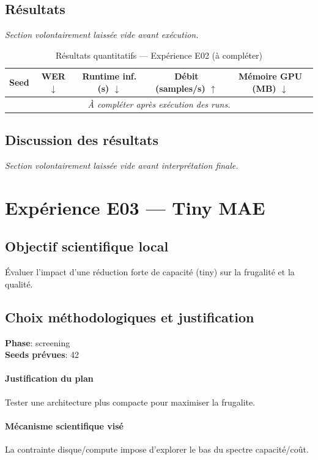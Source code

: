 \documentclass[11pt,a4paper]{article}
\begin{document}
\subsection{Résultats}
\textit{Section volontairement laissée vide avant exécution.}

\begin{table}[H]
\centering
\caption{Résultats quantitatifs --- Expérience E02 (à compléter)}
\begin{tabular}{lcccc}
\toprule
Seed & WER $\downarrow$ & Runtime inf. (s) $\downarrow$ & Débit (samples/s) $\uparrow$ & Mémoire GPU (MB) $\downarrow$ \\
\midrule
\multicolumn{5}{c}{\textit{À compléter après exécution des runs.}} \\
\bottomrule
\end{tabular}
\end{table}

\subsection{Discussion des résultats}
\textit{Section volontairement laissée vide avant interprétation finale.}


\section{Expérience E03 --- Tiny MAE}
\subsection{Objectif scientifique local}
Évaluer l'impact d'une réduction forte de capacité (tiny) sur la frugalité et la qualité.

\subsection{Choix méthodologiques et justification}
\textbf{Phase}: screening\\
\textbf{Seeds prévues}: 42\\


\paragraph{Justification du plan}
Tester une architecture plus compacte pour maximiser la frugalite.

\paragraph{Mécanisme scientifique visé}
La contrainte disque/compute impose d'explorer le bas du spectre capacité/coût.
\end{document}
